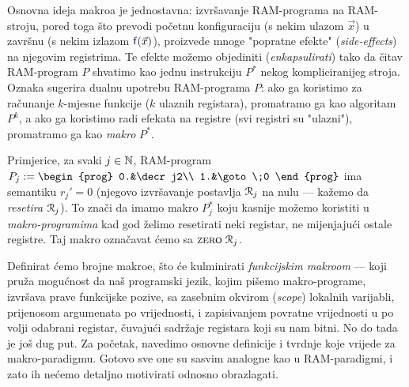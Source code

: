 Osnovna ideja makroa je jednostavna: izvršavanje RAM-programa na RAM-stroju, pored toga što prevodi početnu konfiguraciju (s nekim ulazom $\vec x$) u završnu (s nekim izlazom $\f{f}(\vec x)$), proizvede mnoge "popratne efekte" (\emph{side-effects}) na njegovim registrima. Te efekte možemo objediniti (\emph{enkapsulirati}) tako da čitav RAM-program $P$ shvatimo kao jednu instrukciju $P^*$ nekog kompliciranijeg stroja. 
Oznaka sugerira dualnu upotrebu RAM-programa $P$: ako ga koristimo za računanje $k$-mjesne funkcije ($k$ ulaznih registara), promatramo ga kao algoritam $P^k$, a ako ga koristimo radi efekata na registre (svi registri su "ulazni"), promatramo ga kao \emph{makro} $P^*$.

Primjerice, za svaki $j\in{\mathbb N}$, RAM-program $P_j:=\begin{prog}
0.&\decr j2\\
1.&\goto\;0
\end{prog}$ ima semantiku $r_j'=0$ (njegovo izvršavanje postavlja $\mathcal R_{j}$ na nulu --- kažemo da \emph{resetira} $\mathcal R_{j}$). To znači da imamo makro $P_j^*$ koju kasnije možemo koristiti u \emph{makro-programima} kad god želimo resetirati neki registar, ne mijenjajući ostale registre. Taj makro označavat ćemo sa $\textsc{zero}\;\mathcal R_{j}$.

Definirat ćemo brojne makroe, što će kulminirati \emph{funkcijskim makroom} --- koji pruža mogućnost da naš programski jezik, kojim pišemo makro-programe, izvršava prave funkcijske pozive, sa zasebnim okvirom (\emph{scope}) lokalnih varijabli, prijenosom argumenata po vrijednosti, i zapisivanjem povratne vrijednosti u po volji odabrani registar, čuvajući sadržaje registara koji su nam bitni. No do tada je još dug put. Za početak, navedimo osnovne definicije i tvrdnje koje vrijede za makro-paradigmu. Gotovo sve one su sasvim analogne kao u RAM-paradigmi, i zato ih nećemo detaljno motivirati odnosno obrazlagati.

